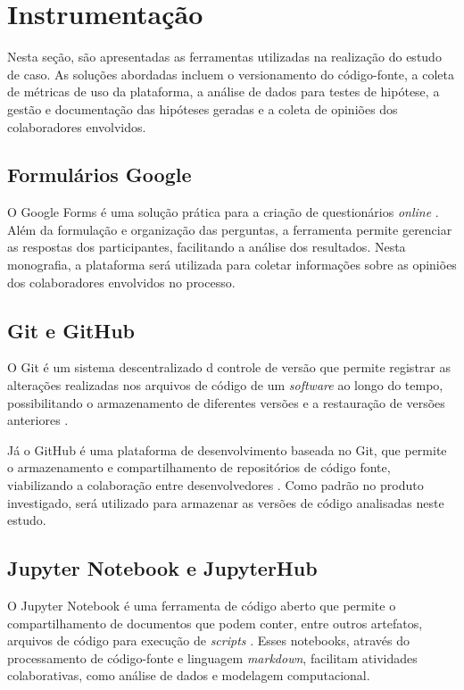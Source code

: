 \section{Instrumentação}

Nesta seção, são apresentadas as ferramentas utilizadas na realização do estudo de caso. As soluções abordadas incluem o versionamento do código-fonte, a coleta de métricas de uso da plataforma, a análise de dados para testes de hipótese, a gestão e documentação das hipóteses geradas e a coleta de opiniões dos colaboradores envolvidos.

\subsection{Formulários Google}

O Google Forms é uma solução prática para a criação de questionários \textit{online} \cite{forms}. Além da formulação e organização das perguntas, a ferramenta permite gerenciar as respostas dos participantes, facilitando a análise dos resultados. Nesta monografia, a plataforma será utilizada para coletar informações sobre as opiniões dos colaboradores envolvidos no processo.

\subsection{Git e GitHub}

O Git é um sistema descentralizado d controle de versão que permite registrar as alterações realizadas nos arquivos de código de um \textit{software} ao longo do tempo, possibilitando o armazenamento de diferentes versões e a restauração de versões anteriores \cite{git}.

Já o GitHub é uma plataforma de desenvolvimento baseada no Git, que permite o armazenamento e compartilhamento de repositórios de código fonte, viabilizando a colaboração entre desenvolvedores \cite{github}. Como padrão no produto investigado, será utilizado para armazenar as versões de código analisadas neste estudo.

\subsection{Jupyter Notebook e JupyterHub}

O Jupyter Notebook é uma ferramenta de código aberto que permite o compartilhamento de documentos que podem conter, entre outros artefatos, arquivos de código para execução de \textit{scripts} \cite{jupyter_notebook}. Esses notebooks, através do processamento de código-fonte e linguagem \textit{markdown}, facilitam atividades colaborativas, como análise de dados e modelagem computacional.

